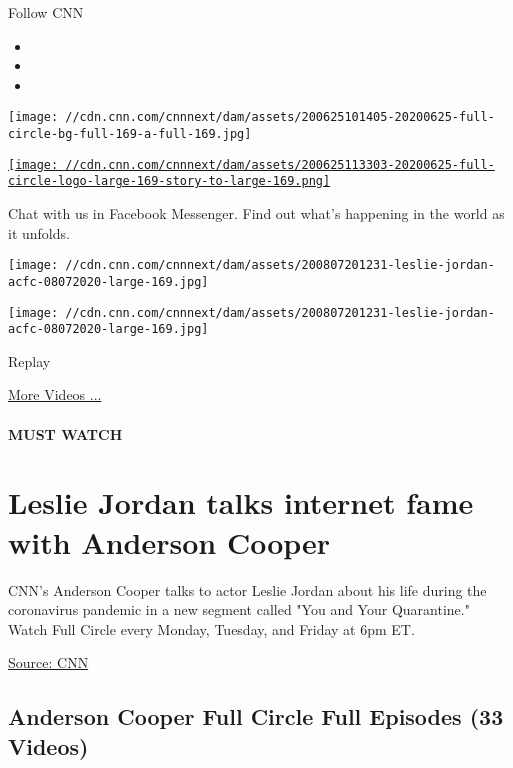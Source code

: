 Follow CNN

\begin{itemize}
\item
\item
\item
\end{itemize}

\texttt{[image: //cdn.cnn.com/cnnnext/dam/assets/200625101405-20200625-full-circle-bg-full-169-a-full-169.jpg]}

\href{/specials/us/anderson-cooper-full-circle}{\texttt{[image: //cdn.cnn.com/cnnnext/dam/assets/200625113303-20200625-full-circle-logo-large-169-story-to-large-169.png]}}

Chat with us in Facebook Messenger. Find out what's happening in the
world as it unfolds.

\texttt{[image: //cdn.cnn.com/cnnnext/dam/assets/200807201231-leslie-jordan-acfc-08072020-large-169.jpg]}

\texttt{[image: //cdn.cnn.com/cnnnext/dam/assets/200807201231-leslie-jordan-acfc-08072020-large-169.jpg]}\href{javascript:void(0);}{}

Replay

\href{/videos}{More Videos ...}

\hypertarget{must-watch}{%
\paragraph{MUST WATCH}\label{must-watch}}

\hypertarget{leslie-jordan-talks-internet-fame-with-anderson-cooper}{%
\section{Leslie Jordan talks internet fame with Anderson
Cooper}\label{leslie-jordan-talks-internet-fame-with-anderson-cooper}}

CNN's Anderson Cooper talks to actor Leslie Jordan about his life during
the coronavirus pandemic in a new segment called "You and Your
Quarantine." Watch Full Circle every Monday, Tuesday, and Friday at 6pm
ET.

\href{https://www.cnn.com/}{Source: CNN}

\hypertarget{anderson-cooper-full-circle-full-episodes-33-videos}{%
\subsection{Anderson Cooper Full Circle Full Episodes (33
Videos)}\label{anderson-cooper-full-circle-full-episodes-33-videos}}

